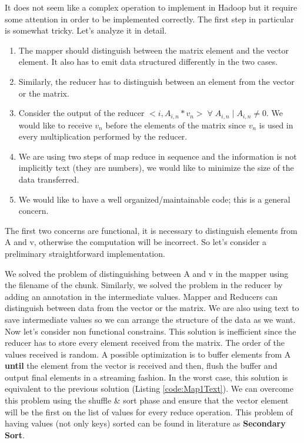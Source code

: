 \documentclass[a4paper,12pt]{article}
\begin{document}
It does not seem like a complex operation to implement in Hadoop but it require some attention in order to be implemented correctly.
The first step in particular is somewhat tricky. 
Let's analyze it in detail.
\begin{enumerate}
\item The mapper should distinguish between the matrix element and the vector element. 
It also has to emit data structured differently in the two cases.
\item Similarly, the reducer has to distinguish between an element from the vector or the matrix.
\item Consider the output of the reducer $<i, A_{i,n}*v_{n}> \; \forall \; A_{i,n} \;|\; A_{i,n} \neq 0$. We would like to receive $v_n$ before the elements of the matrix since $v_n$ is used in every multiplication performed by the reducer.
\item We are using two steps of map reduce in sequence and the information is not implicitly text (they are numbers), we would like to minimize the size of the data transferred.
\item We would like to have a well organized/maintainable code; this is a general concern.
\end{enumerate}

\FloatBarrier
The first two concerns are functional, it is necessary to distinguish elements from A and v, otherwise the computation will be incorrect.
So let's consider a preliminary straightforward implementation.


We solved the problem of distinguishing between A and v in the mapper using the filename of the chunk. 
Similarly, we solved the problem in the reducer by adding an annotation in the intermediate values. 
Mapper and Reducers can distinguish between data from the vector or the matrix.
We are also using text to save intermediate values so we can arrange the structure of the data as we want.
Now let's consider non functional constrains.
This solution is inefficient since the reducer has to store every element received from the matrix. 
The order of the values received is random.
A possible optimization is to buffer elements from A \textbf{until} the element from the vector is received and then, flush the buffer and output final elements in a streaming fashion.
In the worst case, this solution is equivalent to the previous solution (Listing \ref{code:Map1Text}).
We can overcome this problem using the shuffle \& sort phase and ensure that the vector element will be the first on the list of values for every reduce operation.
This problem of having values (not only keys) sorted can be found in literature as \textbf{Secondary Sort}.
\end{document}
